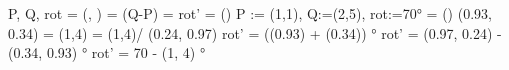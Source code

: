 P, Q, rot
 = (, )
 = (Q-P)
 = 
rot' = (\cdot{})
P := (1,1), Q:=(2,5), rot:=70°
 = () \doteq (0.93, 0.34)
 = (1,4)
 = (1,4)/ \doteq (0.24, 0.97)
rot' = ((0.93) + (0.34)) °
rot' = (0.97, 0.24) - (0.34, 0.93) °
rot' = 70 - (1, 4) °